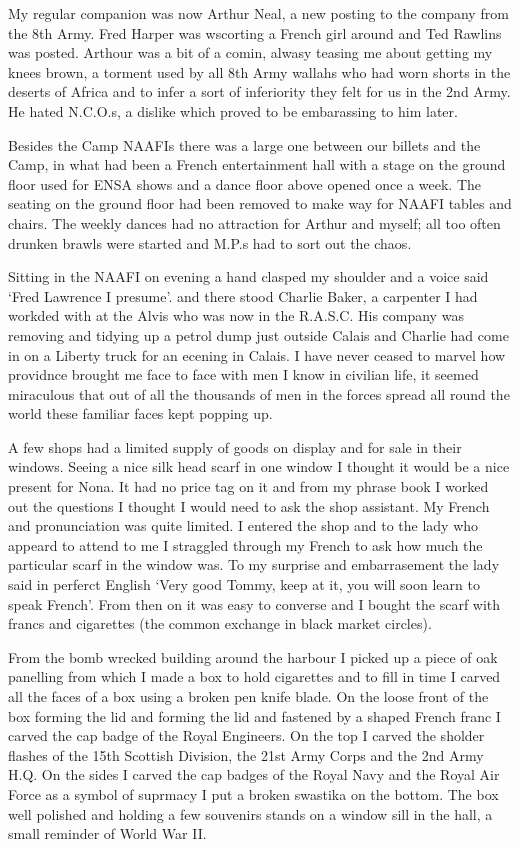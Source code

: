 My regular companion was now Arthur Neal, a new posting to the company
from the 8th Army. Fred Harper was wscorting a French girl around and
Ted Rawlins was posted. Arthour was a bit of a comin, alwasy teasing
me about getting my knees brown, a torment used by all 8th Army
wallahs who had worn shorts in the deserts of Africa and to infer a
sort of inferiority they felt for us in the 2nd Army. He hated
N.C.O.s, a dislike which proved to be embarassing to him later.

Besides the Camp NAAFIs there was a large one between our billets and
the Camp, in what had been a French entertainment hall with a stage on
the ground floor used for ENSA shows and a dance floor above opened
once a week. The seating on the ground floor had been removed to make
way for NAAFI tables and chairs. The weekly dances had no attraction
for Arthur and myself; all too often drunken brawls were started and
M.P.s had to sort out the chaos.

Sitting in the NAAFI on evening a hand clasped my shoulder and a voice
said `Fred Lawrence I presume'. and there stood Charlie Baker, a
carpenter I had workded with at the Alvis who was now in the
R.A.S.C. His company was removing and tidying up a petrol dump just
outside Calais and Charlie had come in on a Liberty truck for an
ecening in Calais. I have never ceased to marvel how providnce brought
me face to face with men I know in civilian life, it seemed miraculous
that out of all the thousands of men in the forces spread all round
the world these familiar faces kept popping up.

A few shops had a limited supply of goods on display and for sale in
their windows. Seeing a nice silk head scarf in one window I thought
it would be a nice present for Nona. It had no price tag on it and
from my phrase book I worked out the questions I thought I would need
to ask the shop assistant. My French and pronunciation was quite
limited. I entered the shop and to the lady who appeard to attend to
me I straggled through my French to ask how much the particular scarf
in the window was. To my surprise and embarrasement the lady said in
perferct English `Very good Tommy, keep at it, you will soon learn to
speak French'. From then on it was easy to converse and I bought the
scarf with francs and cigarettes (the common exchange in black market
circles).

From the bomb wrecked building around the harbour I picked up a piece
of oak panelling from which I made a box to hold cigarettes and to
fill in time I carved all the faces of a box using a broken pen knife
blade. On the loose front of the box forming the lid and forming the
lid and fastened by a shaped French franc I carved the cap badge of
the Royal Engineers. On the top I carved the sholder flashes of the
15th Scottish Division, the 21st Army Corps and the 2nd Army H.Q. On
the sides I carved the cap badges of the Royal Navy and the Royal Air
Force as a symbol of suprmacy I put a broken swastika on the
bottom. The box well polished and holding a few souvenirs stands on a
window sill in the hall, a small reminder of World War II.


